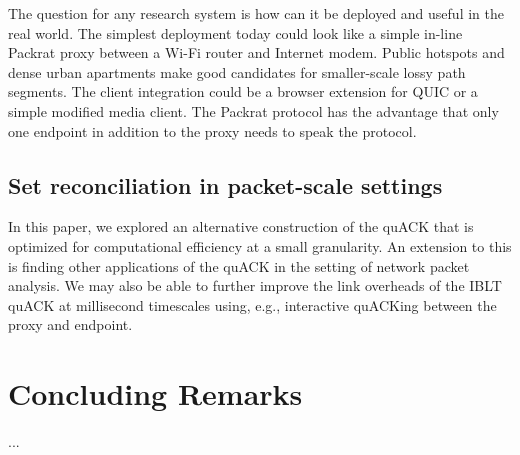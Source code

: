 The question for any research system is how can it be deployed and useful in
the real world. The simplest deployment today could look like a simple in-line
Packrat proxy between a Wi-Fi router and Internet modem. Public hotspots and
dense urban apartments make good candidates for smaller-scale lossy path
segments.
The client integration could be a browser extension for QUIC or a simple
modified media client.
The Packrat protocol has the advantage that only one endpoint in addition to the
proxy needs to speak the protocol.

\subsection{Set reconciliation in packet-scale settings}
\label{sec:conclusion:future:set-reconciliation}

In this paper, we explored an alternative construction of the quACK that is
optimized for computational efficiency at a small granularity. An extension to
this is finding other applications of the quACK in the setting of network
packet analysis. We may also be able to further improve the link overheads of
the IBLT quACK at millisecond timescales using, e.g., interactive quACKing
between the proxy and endpoint.



\section{Concluding Remarks}
\label{sec:conclusion:remarks}
...
